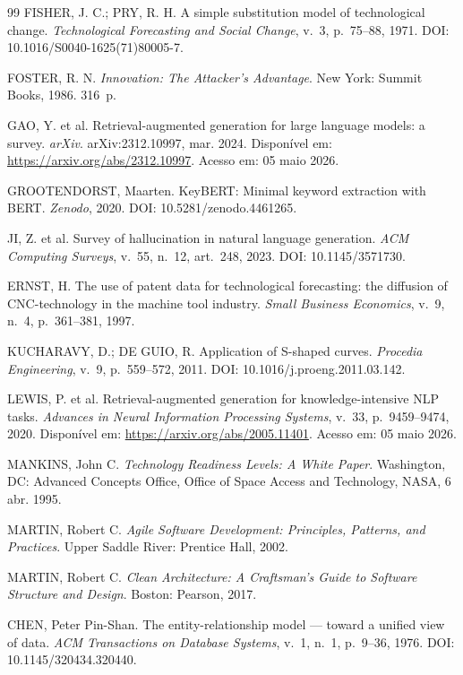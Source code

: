 \documentclass[12pt, a4paper]{article}
\begin{document}
\begin{thebibliography}{99}
FISHER, J. C.; PRY, R. H.
A simple substitution model of technological change.
\textit{Technological Forecasting and Social Change}, v.~3, p.~75--88, 1971.
DOI: 10.1016/S0040-1625(71)80005-7.

FOSTER, R. N.
\textit{Innovation: The Attacker's Advantage}.
New York: Summit Books, 1986. 316~p.

GAO, Y. et al.
Retrieval-augmented generation for large language models: a survey.
\textit{arXiv}. arXiv:2312.10997, mar. 2024.
Disponível em: \url{https://arxiv.org/abs/2312.10997}.
Acesso em: 05 maio 2026.

GROOTENDORST, Maarten.
KeyBERT: Minimal keyword extraction with BERT.
\textit{Zenodo}, 2020.
DOI: 10.5281/zenodo.4461265.

JI, Z. et al.
Survey of hallucination in natural language generation.
\textit{ACM Computing Surveys}, v.~55, n.~12, art.~248, 2023.
DOI: 10.1145/3571730.

ERNST, H.
The use of patent data for technological forecasting: the diffusion of
CNC-technology in the machine tool industry.
\textit{Small Business Economics}, v.~9, n.~4, p.~361--381, 1997.

KUCHARAVY, D.; DE GUIO, R.
Application of S-shaped curves.
\textit{Procedia Engineering}, v.~9, p.~559--572, 2011.
DOI: 10.1016/j.proeng.2011.03.142.

LEWIS, P. et al.
Retrieval-augmented generation for knowledge-intensive NLP tasks.
\textit{Advances in Neural Information Processing Systems}, v.~33,
p.~9459--9474, 2020.
Disponível em: \url{https://arxiv.org/abs/2005.11401}.
Acesso em: 05 maio 2026.

MANKINS, John C.
\textit{Technology Readiness Levels: A White Paper}.
Washington, DC: Advanced Concepts Office, Office of Space Access and
Technology, NASA, 6 abr. 1995.

MARTIN, Robert C.
\textit{Agile Software Development: Principles, Patterns, and Practices}.
Upper Saddle River: Prentice Hall, 2002.

MARTIN, Robert C.
\textit{Clean Architecture: A Craftsman's Guide to Software Structure and
Design}.
Boston: Pearson, 2017.

CHEN, Peter Pin-Shan.
The entity-relationship model --- toward a unified view of data.
\textit{ACM Transactions on Database Systems}, v.~1, n.~1, p.~9--36, 1976.
DOI: 10.1145/320434.320440.


\end{thebibliography}
\end{document}
